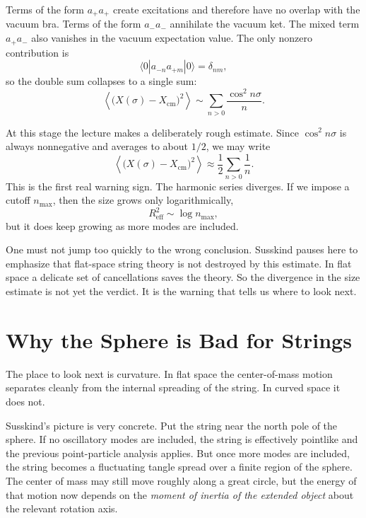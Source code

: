 Terms of the form \(a_{+}a_{+}\) create excitations and therefore have no overlap with the vacuum bra. Terms of the form \(a_{-}a_{-}\) annihilate the vacuum ket. The mixed term \(a_{+}a_{-}\) also vanishes in the vacuum expectation value. The only nonzero contribution is
\begin{equation}
\langle 0|a_{-n}a_{+m}|0\rangle=\delta_{nm},
\end{equation}
so the double sum collapses to a single sum:
\begin{equation}
\left\langle \bigl(X(\sigma)-X_{\mathrm{cm}}\bigr)^2 \right\rangle
\sim
\sum_{n>0}\frac{\cos^2 n\sigma}{n}.
\end{equation}

At this stage the lecture makes a deliberately rough estimate. Since \(\cos^2 n\sigma\) is always nonnegative and averages to about \(1/2\), we may write
\begin{equation}
\left\langle \bigl(X(\sigma)-X_{\mathrm{cm}}\bigr)^2 \right\rangle
\approx
\frac{1}{2}\sum_{n>0}\frac{1}{n}.
\end{equation}
This is the first real warning sign. The harmonic series diverges. If we impose a cutoff \(n_{\max}\), then the size grows only logarithmically,
\begin{equation}
R_{\mathrm{eff}}^2 \sim \log n_{\max},
\end{equation}
but it does keep growing as more modes are included.

One must not jump too quickly to the wrong conclusion. Susskind pauses here to emphasize that flat-space string theory is not destroyed by this estimate. In flat space a delicate set of cancellations saves the theory. So the divergence in the size estimate is not yet the verdict. It is the warning that tells us where to look next.

\section{Why the Sphere is Bad for Strings}

The place to look next is curvature. In flat space the center-of-mass motion separates cleanly from the internal spreading of the string. In curved space it does not.

Susskind's picture is very concrete. Put the string near the north pole of the sphere. If no oscillatory modes are included, the string is effectively pointlike and the previous point-particle analysis applies. But once more modes are included, the string becomes a fluctuating tangle spread over a finite region of the sphere. The center of mass may still move roughly along a great circle, but the energy of that motion now depends on the \emph{moment of inertia of the extended object} about the relevant rotation axis.

